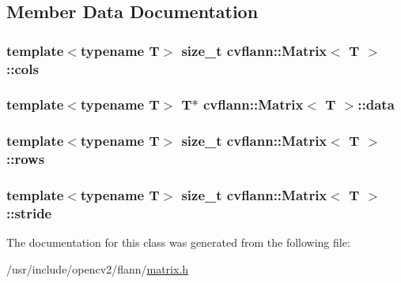 \subsection{Member Data Documentation}
\hypertarget{classcvflann_1_1Matrix_a37b28f9c0d87c84cf396dcbe90fae71f}{
\subsubsection[{cols}]{\setlength{\rightskip}{0pt plus 5cm}template$<$typename T$>$ size\-\_\-t {\bf cvflann\-::\-Matrix}$<$ {\bf T} $>$\-::cols}}\label{classcvflann_1_1Matrix_a37b28f9c0d87c84cf396dcbe90fae71f}
\hypertarget{classcvflann_1_1Matrix_a861faba1129cde780d5f0d0fbc568934}{
\subsubsection[{data}]{\setlength{\rightskip}{0pt plus 5cm}template$<$typename T$>$ {\bf T}$\ast$ {\bf cvflann\-::\-Matrix}$<$ {\bf T} $>$\-::data}}\label{classcvflann_1_1Matrix_a861faba1129cde780d5f0d0fbc568934}
\hypertarget{classcvflann_1_1Matrix_aff6ee6abf050b1848fca59654c5669bc}{
\subsubsection[{rows}]{\setlength{\rightskip}{0pt plus 5cm}template$<$typename T$>$ size\-\_\-t {\bf cvflann\-::\-Matrix}$<$ {\bf T} $>$\-::rows}}\label{classcvflann_1_1Matrix_aff6ee6abf050b1848fca59654c5669bc}
\hypertarget{classcvflann_1_1Matrix_aadef95fb15a5de0464e44b9a3a3979ad}{
\subsubsection[{stride}]{\setlength{\rightskip}{0pt plus 5cm}template$<$typename T$>$ size\-\_\-t {\bf cvflann\-::\-Matrix}$<$ {\bf T} $>$\-::stride}}\label{classcvflann_1_1Matrix_aadef95fb15a5de0464e44b9a3a3979ad}


The documentation for this class was generated from the following file\-:\begin{DoxyCompactItemize}
\item 
/usr/include/opencv2/flann/\hyperlink{matrix_8h}{matrix.\-h}\end{DoxyCompactItemize}
